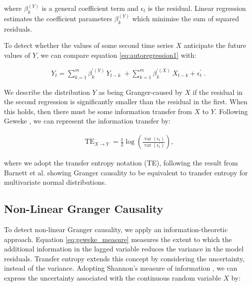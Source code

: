 \documentclass[]{rsos}%
\begin{document}
  where $\beta^{(Y)}_k$ is a general coefficient term and $\epsilon_t$ is the residual. Linear regression estimates the coefficient parameters $\beta^{(Y)}_k$ which minimise the sum of squared residuals. 

  To detect whether the values of some second time series $X$ anticipate the future values of $Y$, we can compare equation \ref{eq:autoregression1}  with: 

  \begin{eqnarray}
    \label{eq:autoregression2}
  Y_t = \sum_{k=1}^m \beta_{k}^{\prime(Y)} \, Y_{t-k}  \; + 
        \sum_{k=1}^m \beta_{k}^{\prime(X)} \, X_{t-k} 
  + \epsilon^{\prime}_t \;.
  \end{eqnarray}

We describe the distribution $Y$ as being Granger-caused by $X$ if the residual in the second regression is significantly smaller than the residual in the first. When this holds, then there must be some information transfer from $X$ to $Y$. Following Geweke \cite{geweke1984measures}, we can represent the information transfer by:

  \begin{eqnarray}
    \label{eq:geweke_measure}
    \operatorname{TE}_{X\rightarrow Y} = \frac12\log \left(
      \frac{\operatorname{var}(\epsilon_t)}
          {\operatorname{var}(\epsilon^{\prime}_t)}
  \right) ,
  \end{eqnarray}

    where we adopt the transfer entropy notation (TE), following the result from Barnett et al. \cite{barnett2009granger} showing Granger causality to be equivalent to transfer entropy for multivariate normal distributions.

  \subsection{Non-Linear {\color{blue}Granger} Causality}

  To detect non-linear {\color{blue}Granger} causality, we apply an information-theoretic approach. Equation \ref{eq:geweke_measure} measures the extent to which the additional information in the lagged variable reduces the variance in the model residuals. Transfer entropy extends this concept by considering the uncertainty, instead of the variance. Adopting Shannon's measure of information \cite{shannon1948}, we can express the uncertainty associated with the continuous random variable $X$ by:
\end{document}
